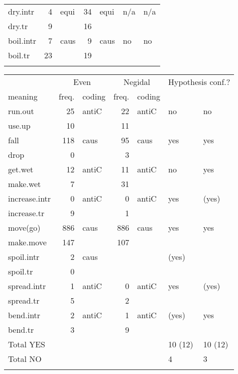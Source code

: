 \documentclass[output=paper,colorlinks,citecolor=brown]{langscibook}
\begin{document}
\begin{paperappendix}
\begin{table}
\begin{tabular}{ l rl rl ll }
  \midrule
dry.intr &	4 &	equi &	34 &	equi &	n/a &	n/a\\
dry.tr &	9 &&		16 &			&&\\
\midrule
boil.intr &	7 &	caus &	9 &	caus &	no &	no\\
boil.tr &	23 &&		19 &			&&\\
  \lspbottomrule
\end{tabular}
\label{table:2Appendix4a}
\end{table}

\begin{table}
\begin{tabular}{ l rl rl ll }
  \lsptoprule
	& \multicolumn{2}{c}{Even} &	\multicolumn{2}{c}{Negidal} & \multicolumn{2}{c}{Hypothesis conf.?}\\\cmidrule(lr){2-3}\cmidrule(lr){4-5}\cmidrule(lr){6-7}
meaning &	freq. &	coding &	freq. &	coding &	\ili{Even} &	\ili{Negidal}\\
\midrule
run.out &	25 &	antiC &	22 &	antiC &	no &	no\\
use.up &	10 &&		11 &			&&\\
\midrule
fall &	118 &	caus &	95 &	caus &	yes &	yes\\
drop &	0 &		 & 3 &			&&\\
\midrule
get.wet &	12 &	antiC &	11 &	antiC &	no &	yes\\
make.wet &	7 &&		31 &			&&\\
\midrule
increase.intr &	0 &	antiC &	0 &	antiC &	yes &	(yes)\\
increase.tr &	9 &&		1 &			&&\\
\midrule
move(go) &	886 &	caus &	886 &	caus &	yes &	yes\\
make.move &	147 &&		107 &			&&\\
\midrule
spoil.intr &	2 &	caus & & &			(yes) &	\\
spoil.tr &	0 & &					&&\\
\midrule
spread.intr &	1 &	antiC &	0 &	antiC &	yes &	(yes)\\
spread.tr &	5 &&		2 &			&&\\
\midrule
bend.intr &	2 &	antiC &	1 &	antiC &	(yes) &	yes\\
bend.tr &	3 &&		9 &			&&\\
\midrule
Total YES & & & & &					10 (12) &	10 (12)\\
Total NO & & & & &					4 & 3\\
  \lspbottomrule
\end{tabular}
\label{table:2Appendix4b}
\end{table}
\end{paperappendix}

{\sloppy\printbibliography[heading=subbibliography,notkeyword=this]}
\end{document}
